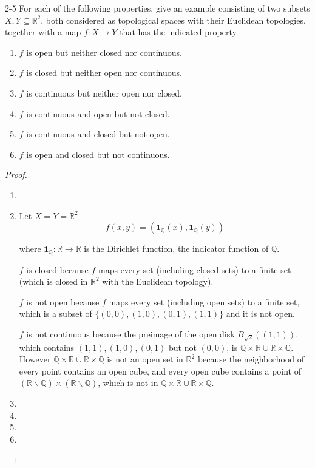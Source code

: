 \begin{problem}{2-5}
For each of the following properties, give an example consisting of two subsets $X, Y \subseteq \mathbb{R}^{2}$, both considered as topological spaces with their Euclidean topologies, together with a map $f: X \to Y$ that has the indicated property.
\begin{enumerate}[label={(\alph*)}]
	\item $f$ is open but neither closed nor continuous.
	\item $f$ is closed but neither open nor continuous.
	\item $f$ is continuous but neither open nor closed.
	\item $f$ is continuous and open but not closed.
	\item $f$ is continuous and closed but not open.
	\item $f$ is open and closed but not continuous.
\end{enumerate}
\end{problem}

\begin{proof}
	\begin{enumerate}[label={(\alph*)}]
		\item
		\item Let $X = Y = \mathbb{R}^{2}$
		      \[
			      f(x, y) = (\mathbf{1}_{\mathbb{Q}}(x), \mathbf{1}_{\mathbb{Q}}(y))
		      \]

		      where $\mathbf{1}_{\mathbb{Q}}: \mathbb{R} \to \mathbb{R}$ is the Dirichlet function, the indicator function of $\mathbb{Q}$.

		      $f$ is closed because $f$ maps every set (including closed sets) to a finite set (which is closed in $\mathbb{R}^{2}$ with the Euclidean topology).

		      $f$ is not open because $f$ maps every set (including open sets) to a finite set, which is a subset of $\{ (0, 0), (1, 0), (0, 1), (1, 1) \}$ and it is not open.

		      $f$ is not continuous because the preimage of the open disk $B_{\sqrt{2}}((1, 1))$, which contains $(1, 1), (1, 0), (0, 1)$ but not $(0, 0)$, is $\mathbb{Q}\times\mathbb{R} \cup \mathbb{R}\times\mathbb{Q}$. However $\mathbb{Q}\times\mathbb{R} \cup \mathbb{R}\times\mathbb{Q}$ is not an open set in $\mathbb{R}^{2}$ because the neighborhood of every point contains an open cube, and every open cube contains a point of $(\mathbb{R}\smallsetminus\mathbb{Q})\times (\mathbb{R}\smallsetminus\mathbb{Q})$, which is not in $\mathbb{Q}\times\mathbb{R} \cup \mathbb{R}\times\mathbb{Q}$.
		\item
		\item
		\item
		\item
	\end{enumerate}
\end{proof}

